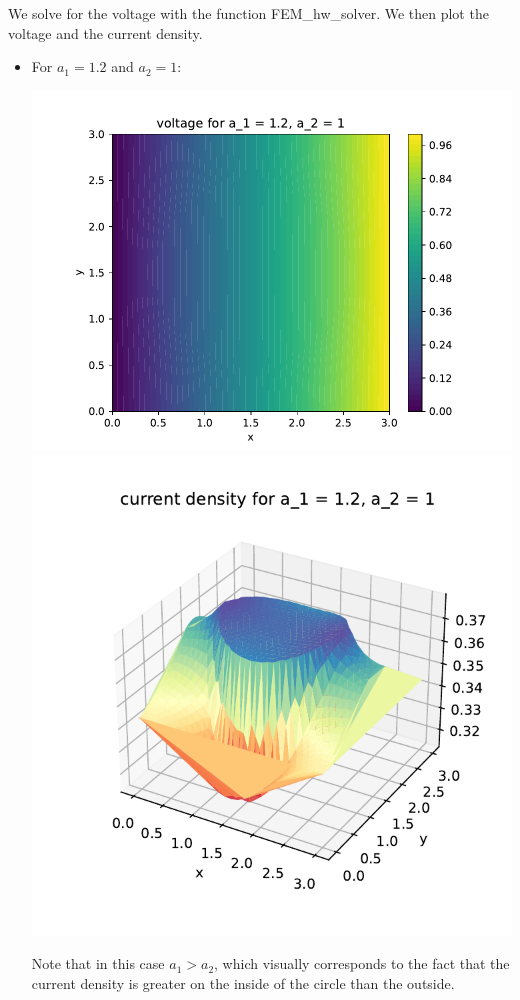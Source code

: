 \documentclass{article}
\begin{document}
\begin{enumerate}
We solve for the voltage with the function FEM\_hw\_solver. We then plot the voltage and the current density.
\begin{itemize}
	\item For $a_1=1.2$ and $a_2=1$:
	\begin{center}
		\includegraphics[scale=.4]{hw8 voltage 1}
		\includegraphics[scale=.4]{hw8 current 1}
	\end{center}
	Note that in this case $a_1>a_2$, which visually corresponds to the fact that the current density is greater on the inside of the circle than the outside.

\end{itemize}
\end{enumerate}
\end{document}
